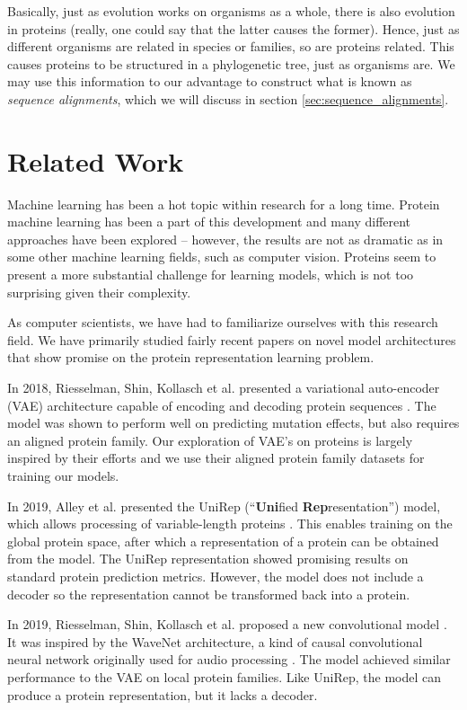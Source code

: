 Basically, just as evolution works on organisms as a whole, there is also evolution in proteins (really, one could say that the latter causes the former). Hence, just as different organisms are related in species or families, so are proteins related. This causes proteins to be structured in a phylogenetic tree, just as organisms are. We may use this information to our advantage to construct what is known as \textit{sequence alignments}, which we will discuss in section \ref{sec:sequence_alignments}.

\section{Related Work}
Machine learning has been a hot topic within research for a long time. Protein machine learning has been a part of this development and many different approaches have been explored -- however, the results are not as dramatic as in some other machine learning fields, such as computer vision. Proteins seem to present a more substantial challenge for learning models, which is not too surprising given their complexity.

As computer scientists, we have had to familiarize ourselves with this research field. We have primarily studied fairly recent papers on novel model architectures that show promise on the protein representation learning problem.

In 2018, Riesselman, Shin, Kollasch et al. presented a variational auto-encoder (VAE) architecture capable of encoding and decoding protein sequences \cite{riesselman2018deep}. The model was shown to perform well on predicting mutation effects, but also requires an aligned protein family. Our exploration of VAE's on proteins is largely inspired by their efforts and we use their aligned protein family datasets for training our models.

In 2019, Alley et al. presented the UniRep (``\textbf{Uni}fied \textbf{Rep}resentation'') model, which allows processing of variable-length proteins \cite{alley2019unified}. This enables training on the global protein space, after which a representation of a protein can be obtained from the model. The UniRep representation showed promising results on standard protein prediction metrics. However, the model does not include a decoder so the representation cannot be transformed back into a protein.

In 2019, Riesselman, Shin, Kollasch et al. proposed a new convolutional model \cite{riesselman2019accelerating}. It was inspired by the WaveNet architecture, a kind of causal convolutional neural network originally used for audio processing \cite{oord2016wavenet}. The model achieved similar performance to the VAE on local protein families. Like UniRep, the model can produce a protein representation, but it lacks a decoder.

